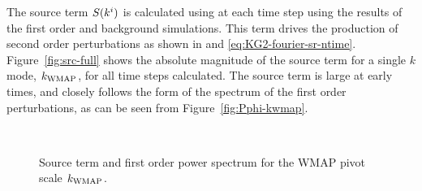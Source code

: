 The source term $S(k^i)$ is calculated using  at each time
step using the results of the first order and background simulations. This term
drives the production of second order perturbations as shown in
 and
\eqref{eq:KG2-fourier-sr-ntime}. Figure~\ref{fig:src-full} shows the
absolute magnitude of the source term for a single $k$ mode, $\kwmap$,
for all time steps calculated. 
The source term is large at early times, and closely follows the form
of the spectrum of the first order perturbations, as can be seen from
Figure~\ref{fig:Pphi-kwmap}.
% 
\begin{figure}[htbp]
\centering
{}\\
% 
\caption[Source Term and First Order Power Spectrum for $\kwmap$]{Source term and
first order power spectrum for the WMAP pivot scale $\kwmap$.}
\end{figure}
